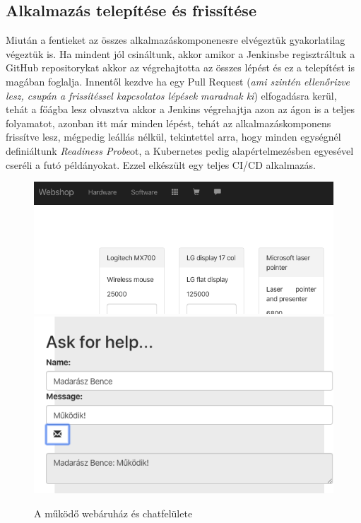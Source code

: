 \subsection{Alkalmazás telepítése és frissítése}
Miután a fentieket az összes alkalmazáskomponenesre elvégeztük gyakorlatilag végeztük is. Ha mindent jól csináltunk, akkor amikor a Jenkinsbe regisztráltuk a GitHub repositorykat akkor az végrehajtotta az összes lépést és ez a telepítést is magában foglalja. Innentől kezdve ha egy Pull Request (\textit{ami szintén ellenőrizve lesz, csupán a frissítéssel kapcsolatos lépések maradnak ki}) elfogadásra kerül, tehát a főágba lesz olvasztva akkor a Jenkins végrehajtja azon az ágon is a teljes folyamatot, azonban itt már minden lépést, tehát az alkalmazáskomponens frissítve lesz, mégpedig leállás nélkül, tekintettel arra, hogy minden egységnél definiáltunk \textit{Readiness Probe}ot, a Kubernetes pedig alapértelmezésben egyesével cseréli a futó példányokat. Ezzel elkészült egy teljes CI/CD alkalmazás.
\begin{figure}[ht]
\centering
\includegraphics[width=120mm, keepaspectratio]{img/appprod.png}
\vskip 0.2in
\includegraphics[width=120mm, keepaspectratio]{img/appchat.png}
\caption{A működő webáruház és chatfelülete}
\end{figure}